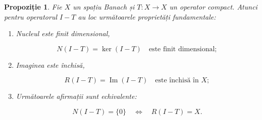 \documentclass[12pt]{article}
\theoremstyle{definition}
\theoremstyle{plain}
\newtheorem{proposition}{Propoziție}
\begin{document}
\begin{proposition}
Fie $X$ un spațiu Banach și $T : X \to X$ un operator compact. Atunci pentru operatorul $I - T$ au loc următoarele proprietăți fundamentale:
\begin{enumerate}
    \item[(i)] Nucleul este finit dimensional,
    

\[
    N(I-T) = \ker(I-T) \quad \text{este finit dimensional};
    \]


    \item[(ii)] Imaginea este închisă,
    

\[
    R(I-T) = \operatorname{Im}(I-T) \quad \text{este închisă în } X;
    \]


    \item[(iii)] Următoarele afirmații sunt echivalente:
    

\[
    N(I-T) = \{0\}
    \quad \Longleftrightarrow \quad
    R(I-T) = X.
    \]


\end{enumerate}
\end{proposition}
\end{document}
